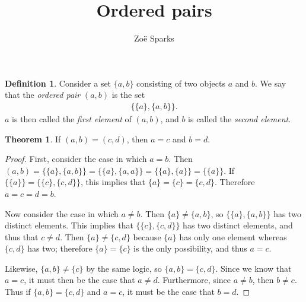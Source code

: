 \documentclass[12pt]{article}
\title{Ordered pairs}
\author{Zoë Sparks}
\begin{document}
\theoremstyle{definition}

\newtheorem{thm}{Theorem}
\newtheorem*{nthm}{Theorem}
\newtheorem{sthm}{}[thm]
\newtheorem{lemma}{Lemma}[thm]
\newtheorem*{nlemma}{Lemma}
\newtheorem{cor}{Corollary}[thm]
\newtheorem*{prop}{Property}
\newtheorem*{defn}{Definition}
\newtheorem*{comm}{Comment}
\newtheorem*{exm}{Example}

\maketitle

\begin{defn}
  Consider a set $\{a,b\}$ consisting of two objects $a$ and $b$. We say that the
  \textit{ordered pair} $(a,b)$ is the set
  \begin{align*}
    \{\{a\},\{a,b\}\}.
  \end{align*}
  $a$ is then called the \textit{first element} of $(a,b)$, and $b$ is called the
  \textit{second element}.
\end{defn}

\begin{thm}
  If $(a,b) = (c,d)$, then $a = c$ and $b = d$.

  \begin{proof}
    First, consider the case in which $a = b$. Then $(a,b) = \{\{a\},\{a,b\}\} =
    \{\{a\},\{a,a\}\} = \{\{a\},\{a\}\} = \{\{a\}\}$. If $\{\{a\}\} =
    \{\{c\},\{c,d\}\}$, this implies that $\{a\} = \{c\} = \{c,d\}$. Therefore $a = c
    = d = b$.

    Now consider the case in which $a \neq b$. Then $\{a\} \neq \{a,b\}$, so
    $\{\{a\},\{a,b\}\}$ has two distinct elements. This implies that
    $\{\{c\},\{c,d\}\}$ has two distinct elements, and thus that $c \neq d$. Then
    $\{a\} \neq \{c,d\}$ because $\{a\}$ has only one element whereas
    $\{c,d\}$ has two; therefore $\{a\} = \{c\}$ is the only possibility, and thus $a
    = c$.

    Likewise, $\{a,b\} \neq \{c\}$ by the same logic, so $\{a,b\} = \{c,d\}$. Since
    we know that $a = c$, it must then be the case that $a \neq d$. Furthermore,
    since $a \neq b$, then $b \neq c$. Thus if $\{a,b\} = \{c,d\}$ and $a = c$, it
    must be the case that $b = d$.
  \end{proof}
\end{thm}
\end{document}
